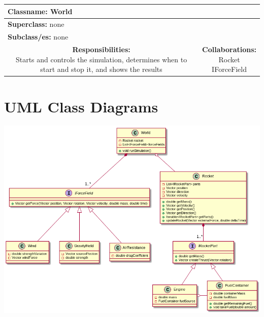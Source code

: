 \documentclass{article}
\begin{document}
\begin {center}
\begin{tabular}{|c|c|}
\hline
\multicolumn{2}{|l|}{\textbf{Classname:} World}\\
\hline
\multicolumn{2}{|l|}{\textbf{Superclass:} none}\\
\multicolumn{2}{|l|}{\textbf{Subclass/es:} none}\\
\hline
\parbox[]{5cm}{\vspace{3px}\textbf{Responsibilities:} \\Starts and controls the simulation, determines when to start and stop it, and shows the results\vspace{3px}} & \parbox[]{5cm}{\textbf{Collaborations:}\\Rocket\\IForceField}\\
\hline
 \end{tabular}\vspace{.4cm}

\end{center}

\section{UML Class Diagrams}
\includegraphics[width=17cm,center]{uml_diagram.png}
\end{document}
